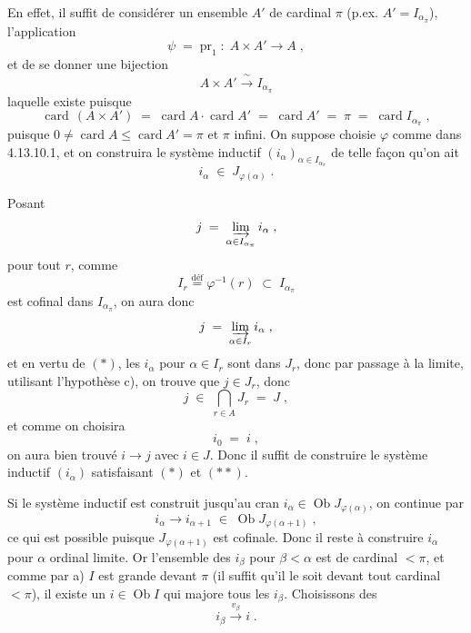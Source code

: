\documentclass[11pt]{article}
\newcommand{\printedpage}[1]{\marginpar{\footnotesize p.~#1}}
\newcommand{\msp}[1]{\marginpar{\footnotesize [#1]}}
\newcommand{\Ob}{\operatorname{Ob}}
\newcommand{\card}{\operatorname{card}}
\begin{document}
En effet, il suffit de considérer un ensemble $A'$ de cardinal $\pi$ (p.ex. $A'=I_{\alpha_\pi}$), l'application
\[ \psi \; = \; \mathrm{pr}_1 \; : \; A\times A'\longrightarrow A \; , \]
et de se donner une bijection
\[ A\times A' \xrightarrow{\ \sim\ } I_{\alpha_\pi} \]
laquelle existe puisque
\[ \card\,(A\times A') \; = \; \card A\cdot\card A' \; = \; \card A' \; = \; \pi \; = \; \card I_{\alpha_\pi} \; , \]
puisque $0\neq\card A\leqslant\card A'=\pi$ et $\pi$ infini. On suppose choisie $\varphi$ comme dans 4.13.10.1, et on construira le système inductif $(i_\alpha)_{\alpha\in I_{\alpha_\pi}}$ de telle façon qu'on ait
\[ i_\alpha \; \in \; J_{\varphi(\alpha)} \; . \]

Posant
\[ j \; = \; \varinjlim_{\alpha\in I_{\alpha_\pi}} i_\alpha \; , \]
\printedpage{112}
\msp{page 300}
pour tout $r$, comme
\[ I_r \overset{\text{déf}}{=} \varphi^{-1}(r) \; \subset \; I_{\alpha_\pi} \]
est cofinal dans $I_{\alpha_\pi}$, on aura donc
\[ j \; = \; \varinjlim_{\alpha\in I_r} i_\alpha \; , \]
et en vertu de $(*)$, les $i_\alpha$ pour $\alpha\in I_r$ sont dans $J_r$, donc par passage à la limite, utilisant l'hypothèse c), on trouve que $j\in J_r$, donc
\[ j \; \in \; \bigcap_{r\in A} J_r \; = \; J \; , \]
et comme on choisira
\[ i_0 \; = \; i \; , \tag*{$(**)$} \]
on aura bien trouvé $i\longrightarrow j$ avec $i\in J$. Donc il suffit de construire le système inductif $(i_\alpha)$ satisfaisant $(*)$ et $(**)$. %

Si le système inductif est construit jusqu'au cran $i_\alpha\in\Ob J_{\varphi(\alpha)}$, on continue par
\[ i_\alpha \longrightarrow i_{\alpha+1} \; \in \; \Ob J_{\varphi(\alpha+1)} \; , \]
ce qui est possible puisque $J_{\varphi(\alpha+1)}$ est
\msp{page 301}
cofinale. Donc il reste à construire $i_\alpha$ pour $\alpha$ ordinal limite. Or l'ensemble des $i_\beta$ pour $\beta<\alpha$ est de cardinal $<\pi$, et comme par a) $I$ est grande devant $\pi$ (il suffit qu'il le soit devant tout cardinal $<\pi$), il existe un $i\in\Ob I$ qui majore tous les $i_\beta$. Choisissons des
\[ i_\beta \xrightarrow{v_\beta} i \; . \]
\end{document}
